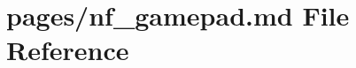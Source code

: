 \hypertarget{nf__gamepad_8md}{}\section{pages/nf\+\_\+gamepad.md File Reference}
\label{nf__gamepad_8md}
